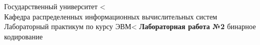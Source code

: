 \begin{titlepage}   
    \begin{center}
    Государственный университет \textless\\
    Кафедра распределенных информационных вычислительных систем\\
    Лабораторный практикум по курсу  ЭВМ\textless
    \vspace*{1cm}
    \textbf{Лабораторная работа №2}
    бинарное кодирование

    \huge
    \textbf{}
    \end{center}
\end{titlepage}